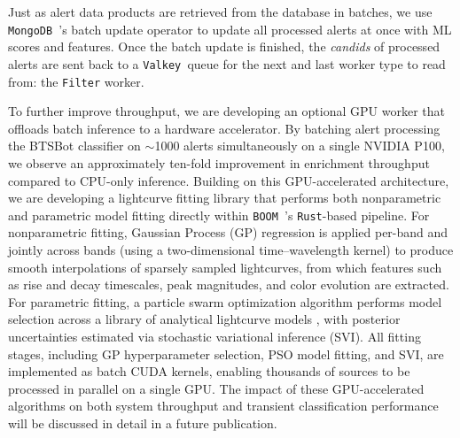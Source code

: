 \documentclass[twocolumn]{aastex631}
\newcommand{\boom}{\texttt{BOOM }}
\newcommand{\valkey}{\texttt{Valkey }}
\newcommand{\mongo}{\texttt{MongoDB }}
\begin{document}
Just as alert data products are retrieved from the database in batches, we use \mongo's batch update operator to update all processed alerts at once with ML scores and features. Once the batch update is finished, the \textit{candids} of processed alerts are sent back to a \valkey queue for the next and last worker type to read from: the \texttt{Filter} worker.

To further improve throughput, we are developing an optional GPU worker that offloads batch inference to a hardware accelerator. By batching alert processing the BTSBot classifier on $\sim$1000 alerts simultaneously on a single NVIDIA P100, we observe an approximately ten-fold improvement in enrichment throughput compared to CPU-only inference. Building on this GPU-accelerated architecture, we are developing a lightcurve fitting library that performs both nonparametric and parametric model fitting directly within \boom's \texttt{Rust}-based pipeline. For nonparametric fitting, Gaussian Process (GP) regression is applied per-band and jointly across bands (using a two-dimensional time--wavelength kernel) to produce smooth interpolations of sparsely sampled lightcurves, from which features such as rise and decay timescales, peak magnitudes, and color evolution are extracted. For parametric fitting, a particle swarm optimization algorithm performs model selection across a library of analytical lightcurve models \citep{deSoto_2024}, with posterior uncertainties estimated via stochastic variational inference (SVI). All fitting stages, including GP hyperparameter selection, PSO model fitting, and SVI, are implemented as batch CUDA kernels, enabling thousands of sources to be processed in parallel on a single GPU. The impact of these GPU-accelerated algorithms on both system throughput and transient classification performance will be discussed in detail in a future publication.
\end{document}
